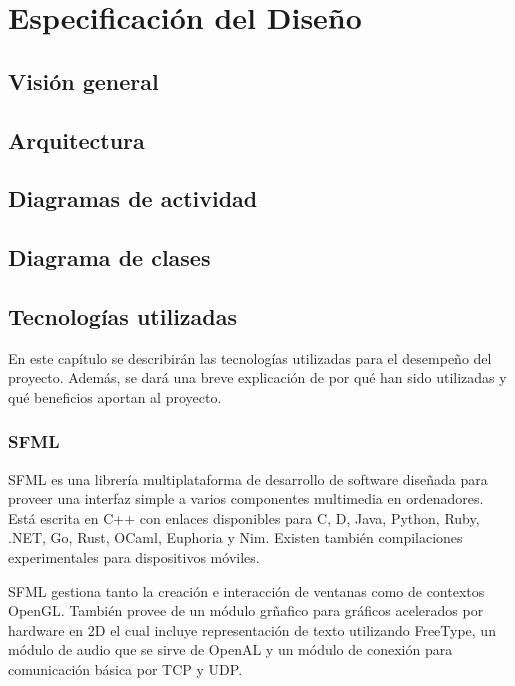 \chapter{Especificación del Diseño}

\section{Visión general}

\section{Arquitectura}

\section{Diagramas de actividad}

\section{Diagrama de clases}

\section{Tecnologías utilizadas}

	En este capítulo se describirán las tecnologías utilizadas para el desempeño del proyecto. Además, se dará una breve explicación de por qué han sido utilizadas y qué beneficios aportan al proyecto.

	\subsection{SFML}

		SFML es una librería multiplataforma de desarrollo de software diseñada para proveer una interfaz simple a varios componentes multimedia en ordenadores. Está escrita en C++ con enlaces disponibles para C, D, Java, Python, Ruby, .NET, Go, Rust, OCaml, Euphoria y Nim. Existen también compilaciones experimentales para dispositivos móviles.

		SFML gestiona tanto la creación e interacción de ventanas como de contextos OpenGL. También provee de un módulo grñafico para gráficos acelerados por hardware en 2D el cual incluye representación de texto utilizando FreeType, un módulo de audio que se sirve de OpenAL y un módulo de conexión para comunicación básica por TCP y UDP.

